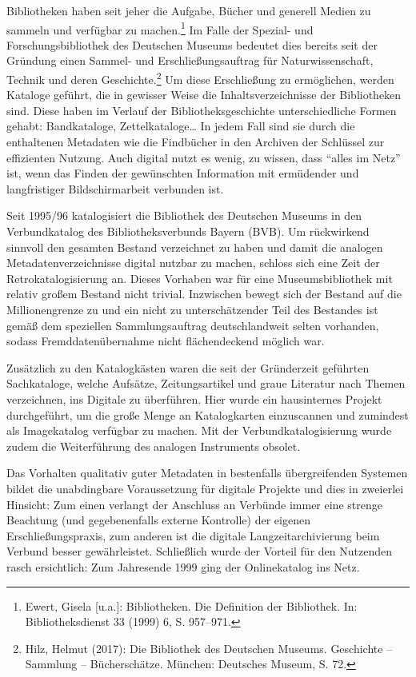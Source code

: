\documentclass[a4paper,
fontsize=11pt,
oneside,
numbers=noperiodatend,
parskip=half-,
bibliography=totoc,
final
]{scrartcl}
\begin{document}
Bibliotheken haben seit jeher die Aufgabe, Bücher und generell Medien zu
sammeln und verfügbar zu machen.\footnote{Ewert, Gisela {[}u.a.{]}:
  Bibliotheken. Die Definition der Bibliothek. In: Bibliotheksdienst 33
  (1999) 6, S. 957--971.} Im Falle der Spezial- und Forschungsbibliothek
des Deutschen Museums bedeutet dies bereits seit der Gründung einen
Sammel- und Erschließungsauftrag für Naturwissenschaft, Technik und
deren Geschichte.\footnote{Hilz, Helmut (2017): Die Bibliothek des
  Deutschen Museums. Geschichte -- Sammlung -- Bücherschätze. München:
  Deutsches Museum, S. 72.} Um diese Erschließung zu ermöglichen, werden
Kataloge geführt, die in gewisser Weise die Inhaltsverzeichnisse der
Bibliotheken sind. Diese haben im Verlauf der Bibliotheksgeschichte
unterschiedliche Formen gehabt: Bandkataloge, Zettelkataloge\ldots{} In
jedem Fall sind sie durch die enthaltenen Metadaten wie die Findbücher
in den Archiven der Schlüssel zur effizienten Nutzung. Auch digital
nutzt es wenig, zu wissen, dass \enquote{alles im Netz} ist, wenn das
Finden der gewünschten Information mit ermüdender und langfristiger
Bildschirmarbeit verbunden ist.

Seit 1995/96 katalogisiert die Bibliothek des Deutschen Museums in den
Verbundkatalog des Bibliotheksverbunds Bayern (BVB). Um rückwirkend
sinnvoll den gesamten Bestand verzeichnet zu haben und damit die
analogen Metadatenverzeichnisse digital nutzbar zu machen, schloss sich
eine Zeit der Retrokatalogisierung an. Dieses Vorhaben war für eine
Museumsbibliothek mit relativ großem Bestand nicht trivial. Inzwischen
bewegt sich der Bestand auf die Millionengrenze zu und ein nicht zu
unterschätzender Teil des Bestandes ist gemäß dem speziellen
Sammlungsauftrag deutschlandweit selten vorhanden, sodass
Fremddatenübernahme nicht flächendeckend möglich war.

Zusätzlich zu den Katalogkästen waren die seit der Gründerzeit geführten
Sachkataloge, welche Aufsätze, Zeitungsartikel und graue Literatur nach
Themen verzeichnen, ins Digitale zu überführen. Hier wurde ein
hausinternes Projekt durchgeführt, um die große Menge an Katalogkarten
einzuscannen und zumindest als Imagekatalog verfügbar zu machen. Mit der
Verbundkatalogisierung wurde zudem die Weiterführung des analogen
Instruments obsolet.

Das Vorhalten qualitativ guter Metadaten in bestenfalls übergreifenden
Systemen bildet die unabdingbare Voraussetzung für digitale Projekte und
dies in zweierlei Hinsicht: Zum einen verlangt der Anschluss an Verbünde
immer eine strenge Beachtung (und gegebenenfalls externe Kontrolle) der
eigenen Erschließungspraxis, zum anderen ist die digitale
Langzeitarchivierung beim Verbund besser gewährleistet. Schließlich
wurde der Vorteil für den Nutzenden rasch ersichtlich: Zum Jahresende
1999 ging der Onlinekatalog ins Netz.
\end{document}

